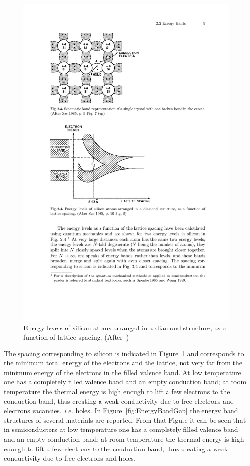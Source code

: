 \begin{figure}[htbp]
   \centering
   \includegraphics{EnergyLevels.pdf} %
   \caption{\label{fig:EnergyLevels}Energy levels of silicon atoms arranged in a diamond structure, as a function of lattice spacing. (After~\cite{Lutz:411172})}
\end{figure}

The spacing corresponding to silicon is indicated in Figure~\ref{fig:EnergyLevels} and corresponds to 
the minimum total energy of the electrons and the lattice, not very far from the minimum energy of
 the electrons in the filled valence band. 
 At low temperature one has a completely filled valence band and an empty conduction band; at room 
 temperature the thermal energy is high enough to lift a few electrons to the conduction band, thus 
 creating a weak conductivity due to free electrons and electrons vacancies, {\it i.e.} holes.
In Figure~\ref{fig:EnergyBandGap} the energy band structures of several materials are reported. 
From that Figure it can be seen that in semiconductors at low temperature one has a completely filled valence band and an empty conduction band; at room 
temperature the thermal energy is high enough to lift a few electrons to the conduction band, thus 
creating a weak conductivity due to free electrons and holes.
 
